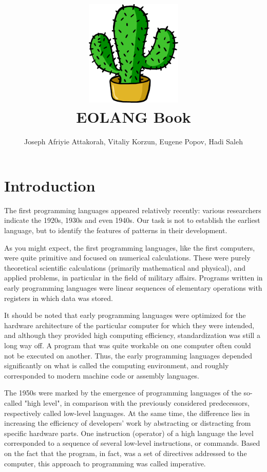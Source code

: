 \documentclass[12pt]{book}
\title{\includegraphics[height=2in]{cactus.pdf} \\[1in] EOLANG Book}
\author{Joseph Afriyie Attakorah,
  Vitaliy Korzun,
  Eugene Popov,
  Hadi Saleh}
\begin{document}
\raggedbottom

\maketitle

\tableofcontents

\chapter{Introduction}
The  first programming languages appeared relatively recently: various researchers indicate the 1920s, 1930s and even 1940s. Our task is not to establish the earliest language, but to identify the features of patterns in their development.

As you might expect, the first programming languages, like the first computers, were quite primitive and focused on numerical calculations. These were purely theoretical scientific calculations (primarily mathematical and physical), and applied problems, in particular in the field of military affairs. Programs written in early programming languages were linear sequences of elementary operations with registers in which data was stored.

It should be noted that early programming languages were optimized for the hardware architecture of the particular computer for which they were intended, and  although they provided high computing efficiency, standardization was still a long way off. A program that was quite workable on one computer often could not be executed on another. Thus, the early programming languages depended significantly on what is called the computing environment, and roughly corresponded to modern machine code or assembly languages.

The 1950s were marked by the emergence of programming languages of the so-called "high level", in comparison with the previously considered predecessors, respectively called low-level languages. At the same time, the difference lies in increasing the efficiency of developers' work by abstracting or distracting from specific hardware parts. One instruction (operator) of a high language the level corresponded to a sequence of several low-level instructions, or commands. Based on the fact that the program, in fact, was a set of directives addressed to the computer, this approach to programming was called imperative.
\end{document}
